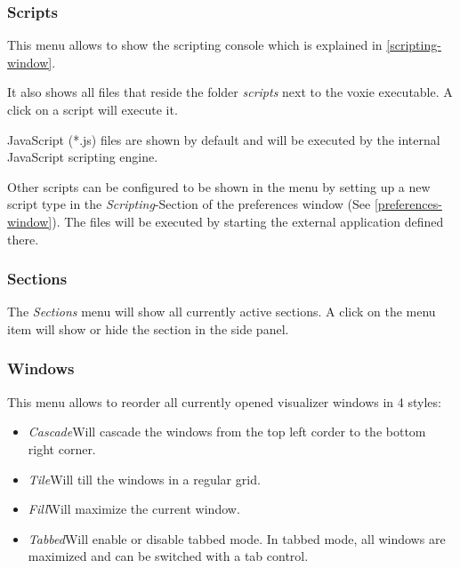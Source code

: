 \subsubsection{Scripts}

This menu allows to show the scripting console which is explained in \ref{scripting-window}.

It also shows all files that reside the folder \emph{scripts} next
to the voxie executable. A click on a script will execute it.

JavaScript (*.js) files are shown by default and will be executed by the
internal JavaScript scripting engine.

Other scripts can be configured to be shown in the menu by setting up a new
script type in the \emph{Scripting}-Section of the preferences window (See \ref{preferences-window}). The files will be executed by starting the external
application defined there.

\subsubsection{Sections}

The \emph{Sections} menu will show all currently active sections.
A click on the menu item will show or hide the section in the side panel.

\subsubsection{Windows}

This menu allows to reorder all currently opened visualizer windows in 4 styles:
\begin{itemize}
	\item{\emph{Cascade}\newline Will cascade the windows from the top left
		corder to the bottom right corner.}
	\item{\emph{Tile}\newline Will till the windows in a regular grid.}
	\item{\emph{Fill}\newline Will maximize the current window.}
	\item{\emph{Tabbed}\newline Will enable or disable tabbed mode. In tabbed mode,
		all windows are maximized and can be switched with a tab control.}
\end{itemize}

